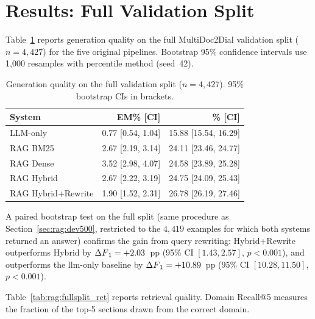 \section{Results: Full Validation Split}\label{sec:rag:fullsplit}

Table~\ref{tab:rag:fullsplit} reports generation quality on the full MultiDoc2Dial
validation split ($n = 4{,}427$) for the five original pipelines.
Bootstrap 95\% confidence intervals use 1{,}000 resamples with percentile method
(seed~42).

\begin{table}[ht]
    \centering
    \caption{Generation quality on the full validation split ($n = 4{,}427$).
             95\% bootstrap CIs in brackets.}
    \label{tab:rag:fullsplit}
    \begin{tabular}{lrr}
        \toprule
        System & EM\% [CI] & \fone{}\% [CI] \\
        \midrule
        LLM-only           & 0.77 [0.54, 1.04] & 15.88 [15.54, 16.29] \\
        RAG BM25           & 2.67 [2.19, 3.14] & 24.11 [23.46, 24.77] \\
        RAG Dense          & 3.52 [2.98, 4.07] & 24.58 [23.89, 25.28] \\
        RAG Hybrid         & 2.67 [2.22, 3.19] & 24.75 [24.09, 25.43] \\
        RAG Hybrid+Rewrite & 1.90 [1.52, 2.31] & 26.78 [26.19, 27.46] \\
        \bottomrule
    \end{tabular}
\end{table}

A paired bootstrap test on the full split (same procedure as
Section~\ref{sec:rag:dev500}, restricted to the $4{,}419$ examples for which both
systems returned an answer) confirms the gain from query rewriting: Hybrid+Rewrite
outperforms Hybrid by $\Delta F\textsubscript{1} = {+}2.03$~pp (95\% CI $[1.43, 2.57]$,
$p < 0.001$), and outperforms the \gls{llm}-only baseline by
$\Delta F\textsubscript{1} = {+}10.89$~pp (95\% CI $[10.28, 11.50]$, $p < 0.001$).

Table~\ref{tab:rag:fullsplit_ret} reports retrieval quality. Domain Recall@5 measures
the fraction of the top-5 sections drawn from the correct domain.


